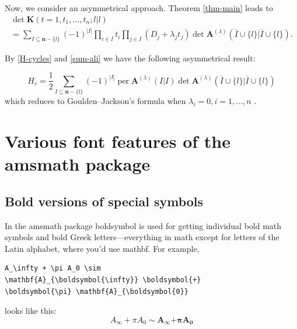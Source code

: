 \documentclass[manuscript, printscheme]{aomart}
\newcommand{\ntt}{\normalfont\ttfamily}
\newcommand{\cn}[1]{{\protect\ntt\bslash#1}}
\newcommand{\pkg}[1]{{\protect\ntt#1}}
\newtheorem[{}\it]{thm}{Theorem}[section]
\theoremstyle{definition}
\newtheorem*[{}\it]{notation}{Notation}
\DeclareMathOperator{\per}{per}
\newcommand{\envert}[1]{\left\lvert#1\right\rvert}
\let\abs=\envert
\begin{document}
Now, we consider an asymmetrical approach. Theorem \ref{thm-main} leads to
\begin{multline}
\det\mathbf{K}(t=1,t_1,\dots,t_n;l |l )\\
=\sum_{I\subseteq\mathbf{n}-\{l \}}
(-1)^{\abs{I}}\prod_{i\in I}t_i\prod_{j\in I}
(D_j+\lambda_jt_j)\det\mathbf{A}^{(\lambda)}
(\overline I\cup\{l \}|\overline I\cup\{l \}).
\end{multline}

By \eqref{H-cycles} and \eqref{sum-ali} we have the following asymmetrical
result:
\begin{thm}\label{thm-asym}
\begin{equation}
H_c=\frac12\sum_{I\subseteq\mathbf{n}-\{l \}}
(-1)^{\abs{I}}\per\mathbf{A}^{(\lambda)}(I|I)\det
\mathbf{A}^{(\lambda)}
(\overline I\cup\{l \}|\overline I\cup\{l \})
\end{equation}
which reduces to Goulden--Jackson's formula when $\lambda_i=0,i=1,\dots,n$
\cite{mami:matrixth}.
\end{thm}


\section{Various font features of the \pkg{amsmath} package}
\label{s:font}
\subsection{Bold versions of special symbols}

In the \pkg{amsmath} package \cn{boldsymbol} is used for getting
individual bold math symbols and bold Greek letters---everything in
math except for letters of the Latin alphabet,
where you'd use \cn{mathbf}.  For example,
\begin{verbatim}
A_\infty + \pi A_0 \sim
\mathbf{A}_{\boldsymbol{\infty}} \boldsymbol{+}
\boldsymbol{\pi} \mathbf{A}_{\boldsymbol{0}}
\end{verbatim}
looks like this:
\[A_\infty + \pi A_0 \sim \mathbf{A}_{\boldsymbol{\infty}}
\boldsymbol{+} \boldsymbol{\pi} \mathbf{A}_{\boldsymbol{0}}\]
\end{document}
